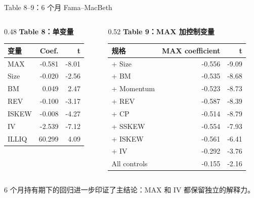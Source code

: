 \documentclass[aspectratio=169,10pt]{beamer}
\begin{document}
\begin{frame}{Table 8--9：6 个月 Fama--MacBeth}
	\begin{columns}[t]
		\begin{column}{0.48\textwidth}
			\textbf{Table 8：单变量}
			\scriptsize
			\begin{tabular}{lrr}
				\toprule
				变量 & Coef. & t\\
				\midrule
				MAX & -0.581 & -8.01\\
				Size & -0.020 & -2.56\\
				BM & 0.049 & 2.47\\
				REV & -0.100 & -3.17\\
				ISKEW & -0.008 & -4.27\\
				IV & -2.539 & -7.12\\
				ILLIQ & 60.299 & 4.09\\
				\bottomrule
			\end{tabular}
		\end{column}
		\begin{column}{0.52\textwidth}
			\textbf{Table 9：MAX 加控制变量}
			\scriptsize
			\begin{tabular}{lrr}
				\toprule
				规格 & MAX coefficient & t\\
				\midrule
				+ Size & -0.556 & -9.09\\
				+ BM & -0.535 & -8.68\\
				+ Momentum & -0.523 & -8.73\\
				+ REV & -0.587 & -8.39\\
				+ CP & -0.514 & -8.79\\
				+ SSKEW & -0.554 & -7.93\\
				+ ISKEW & -0.561 & -6.41\\
				+ IV & -0.292 & -3.76\\
				All controls & -0.155 & -2.16\\
				\bottomrule
			\end{tabular}
		\end{column}
	\end{columns}
	\par\vspace{5pt}
	\small 6 个月持有期下的回归进一步印证了主结论：MAX 和 IV 都保留独立的解释力。
\end{frame}
\end{document}
